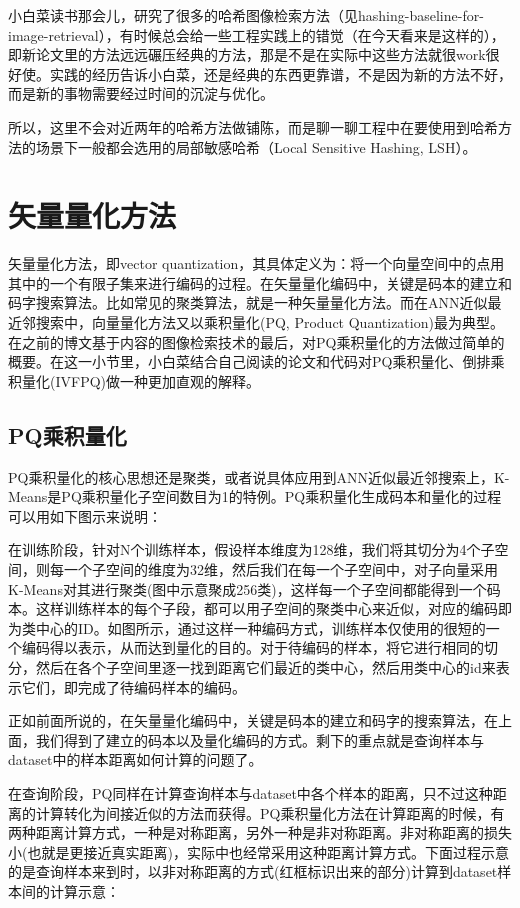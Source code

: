 \documentclass[color=cyan,mathpazo,titlestyle=hang]{elegantbook}
\begin{document}
小白菜读书那会儿，研究了很多的哈希图像检索方法（见hashing-baseline-for-image-retrieval），有时候总会给一些工程实践上的错觉（在今天看来是这样的），即新论文里的方法远远碾压经典的方法，那是不是在实际中这些方法就很work很好使。实践的经历告诉小白菜，还是经典的东西更靠谱，不是因为新的方法不好，而是新的事物需要经过时间的沉淀与优化。

所以，这里不会对近两年的哈希方法做铺陈，而是聊一聊工程中在要使用到哈希方法的场景下一般都会选用的局部敏感哈希（Local Sensitive Hashing, LSH）。

\section{矢量量化方法}

矢量量化方法，即vector quantization，其具体定义为：将一个向量空间中的点用其中的一个有限子集来进行编码的过程。在矢量量化编码中，关键是码本的建立和码字搜索算法。比如常见的聚类算法，就是一种矢量量化方法。而在ANN近似最近邻搜索中，向量量化方法又以乘积量化(PQ, Product Quantization)最为典型。在之前的博文基于内容的图像检索技术的最后，对PQ乘积量化的方法做过简单的概要。在这一小节里，小白菜结合自己阅读的论文和代码对PQ乘积量化、倒排乘积量化(IVFPQ)做一种更加直观的解释。

\subsection{PQ乘积量化}

PQ乘积量化的核心思想还是聚类，或者说具体应用到ANN近似最近邻搜索上，K-Means是PQ乘积量化子空间数目为1的特例。PQ乘积量化生成码本和量化的过程可以用如下图示来说明：

在训练阶段，针对N个训练样本，假设样本维度为128维，我们将其切分为4个子空间，则每一个子空间的维度为32维，然后我们在每一个子空间中，对子向量采用K-Means对其进行聚类(图中示意聚成256类)，这样每一个子空间都能得到一个码本。这样训练样本的每个子段，都可以用子空间的聚类中心来近似，对应的编码即为类中心的ID。如图所示，通过这样一种编码方式，训练样本仅使用的很短的一个编码得以表示，从而达到量化的目的。对于待编码的样本，将它进行相同的切分，然后在各个子空间里逐一找到距离它们最近的类中心，然后用类中心的id来表示它们，即完成了待编码样本的编码。

正如前面所说的，在矢量量化编码中，关键是码本的建立和码字的搜索算法，在上面，我们得到了建立的码本以及量化编码的方式。剩下的重点就是查询样本与dataset中的样本距离如何计算的问题了。

在查询阶段，PQ同样在计算查询样本与dataset中各个样本的距离，只不过这种距离的计算转化为间接近似的方法而获得。PQ乘积量化方法在计算距离的时候，有两种距离计算方式，一种是对称距离，另外一种是非对称距离。非对称距离的损失小(也就是更接近真实距离)，实际中也经常采用这种距离计算方式。下面过程示意的是查询样本来到时，以非对称距离的方式(红框标识出来的部分)计算到dataset样本间的计算示意：
\end{document}
